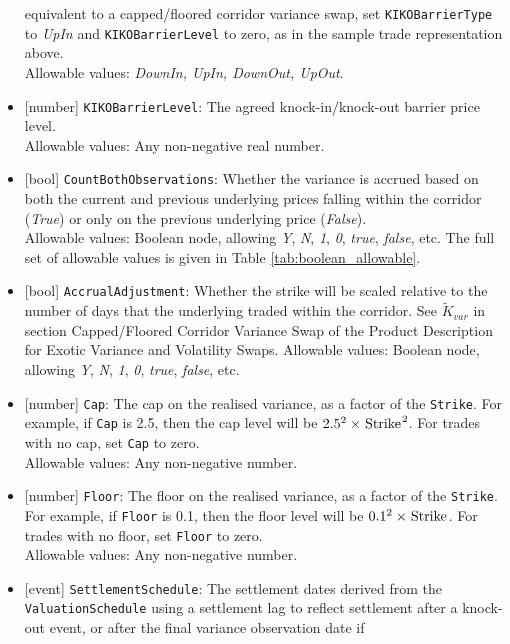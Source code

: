 \begin{itemize}
  equivalent to a capped/floored corridor variance swap, set \lstinline!KIKOBarrierType! to \emph{UpIn} and
  \lstinline!KIKOBarrierLevel! to zero, as in the sample trade representation above. \\
  Allowable values: \emph{DownIn, UpIn, DownOut, UpOut}.
  \item{}[number] \lstinline!KIKOBarrierLevel!: The agreed knock-in/knock-out barrier price level. \\
  Allowable values: Any non-negative real number.
  \item{}[bool] \lstinline!CountBothObservations!: Whether the variance is accrued based on both the current and
  previous underlying prices falling within the corridor (\emph{True}) or only on the previous underlying price
  (\emph{False}). \\
  Allowable values: Boolean node, allowing \emph{Y}, \emph{N}, \emph{1}, \emph{0}, \emph{true}, \emph{false}, etc.
  The full set of allowable values is given in Table \ref{tab:boolean_allowable}.
  \item{}[bool] \lstinline!AccrualAdjustment!: Whether the strike will be scaled relative to the number of days that the
  underlying traded within the corridor. See $\widetilde{K}_{var}$ in section Capped/Floored Corridor Variance
  Swap of the Product Description for Exotic Variance and Volatility Swaps.
  Allowable values: Boolean node, allowing \emph{Y}, \emph{N}, \emph{1}, \emph{0}, \emph{true}, \emph{false}, etc.
  \item{}[number] \lstinline!Cap!: The cap on the realised variance, as a factor of the \lstinline!Strike!. For example,
  if \lstinline!Cap! is 2.5, then the cap level will be $2.5^2 \times \text{\lstinline!Strike!}^2$. For trades
  with no cap, set \lstinline!Cap! to zero. \\
  Allowable values: Any non-negative number.
  \item{}[number] \lstinline!Floor!: The floor on the realised variance, as a factor of the \lstinline!Strike!. For example,
  if \lstinline!Floor! is 0.1, then the floor level will be $0.1^2 \times \text{\lstinline!Strike!}$. For trades
  with no floor, set \lstinline!Floor! to zero. \\
  Allowable values: Any non-negative number.
  \item{}[event] \lstinline!SettlementSchedule!: The settlement dates derived from the \lstinline!ValuationSchedule! using a
  settlement lag to reflect settlement after a knock-out event, or after the final variance observation date if

\end{itemize}
